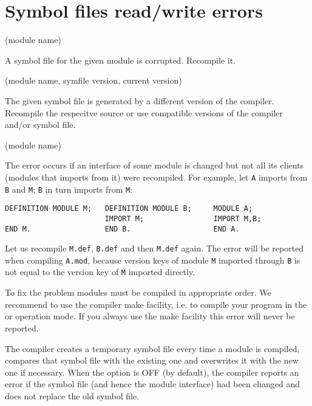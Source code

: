 \section{Symbol files read/write errors}

(module name)

A symbol file for the given module is corrupted. Recompile it.

(module name, symfile version, current version)

The given symbol file is generated by a different 
version of the compiler. Recompile the respecitve source
or use compatible versions of the compiler and/or symbol file.


(module name)

The error occurs if an interface of some module is changed but not
all its clients (modules that imports from it) were recompiled.
For example, let \verb'A' imports from \verb'B' and \verb'M';
\verb'B' in turn imports from \verb'M':

\begin{verbatim}
DEFINITION MODULE M;   DEFINITION MODULE B;     MODULE A;
                       IMPORT M;                IMPORT M,B;
END M.                 END B.                   END A.
\end{verbatim}

Let us recompile \verb'M.def', \verb'B.def' and then \verb'M.def' again. The error will
be reported when compiling \verb'A.mod', because version keys of module \verb'M'
imported through \verb'B' is not equal to the version key of \verb'M' imported directly.

To fix the problem modules must be compiled in appropriate order.
We recommend to use the \XDS{} compiler make facility, i.e. to compile your
program in the  or 
operation mode. If you always use the make facility this error
will never be reported.


The \ot{} compiler creates a temporary symbol file every time a
module is compiled, compares that symbol file with the existing one and
overwrites it with the new one if necessary. When the  option
is OFF (by default), the compiler reports an error if the symbol file
(and hence the module interface) had been changed and does not
replace the old symbol file.

